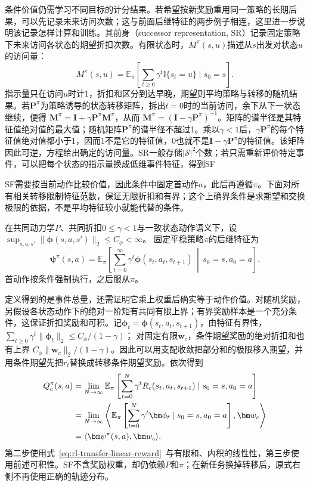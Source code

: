 条件价值仍需学习不同目标的计分结果。若希望按新奖励重用同一策略的长期后果，可以先记录未来访问次数；这与前面后继特征的两步例子相连，这里进一步说明该记录怎样计算和训练。其前身（successor representation, SR）记录固定策略下未来访问各状态的期望折扣次数。有限状态时，$M^\pi(s,u)$描述从$s$出发对状态$u$的访问量：
\[
 M^\pi(s,u)=\mathbb E_\pi\!\left[\sum_{t\geq0}\gamma^t
       \mathbb I\{s_t=u\}\mid s_0=s\right].
\]
指示量只在访问$u$时计1，折扣和区分到达早晚，期望则平均策略与转移的随机结果。若$\bm P^\pi$为策略诱导的状态转移矩阵，拆出$t=0$时的当前访问，余下从下一状态继续，便得
$\bm M^\pi=\bm I+\gamma\bm P^\pi\bm M^\pi$，从而
$\bm M^\pi=(\bm I-\gamma\bm P^\pi)^{-1}$。矩阵的谱半径是其特征值绝对值的最大值；随机矩阵$\bm P^\pi$的谱半径不超过1。乘以$\gamma<1$后，$\gamma\bm P^\pi$的每个特征值绝对值都小于1，因而1不是它的特征值，0也就不是$\bm I-\gamma\bm P^\pi$的特征值。该矩阵因此可逆，方程给出确定的访问量。SR一般存储$|\mathcal S|^2$个数；若只需重新评价特定事件，可以把每个状态的指示量换成低维事件特征，得到SF

SF需要按当前动作比较价值，因此条件中固定首动作$a$，此后再遵循$\pi$。下面对所有相关转移限制特征范数，保证无限折扣和有界；这个上确界条件是求期望和交换极限的依据，不是平均特征较小就能代替的条件。

\begin{definition}[固定策略的后继特征]
 \label{def:rl-transfer-sf}
 在共同动力学$P$、共同折扣$0\leq\gamma<1$与一致状态动作语义下，设
 $\sup_{s,a,s'}\lVert\bm\phi(s,a,s')\rVert_2\leq C_\phi<\infty$。
 固定平稳策略$\pi$的后继特征为
 \begin{equation}
 \bm\psi^\pi(s,a)=
 \mathbb E_\pi\!\left[
 \sum_{t=0}^{\infty}\gamma^t\bm\phi(s_t,a_t,s_{t+1})
 \,\middle|\,s_0=s,a_0=a\right].
 \label{eq:rl-transfer-sf}
 \end{equation}
 首动作按条件强制执行，之后服从$\pi$。
\end{definition}

定义得到的是事件总量，还需证明它乘上权重后确实等于动作价值。对随机奖励，另假设各状态动作下的绝对一阶矩有共同有限上界；有界奖励样本是一个充分条件，这保证折扣奖励和可积。记$\bm\phi_t=\bm\phi(s_t,a_t,s_{t+1})$，由特征有界性，
$\sum_{t\geq0}\gamma^t\lVert\bm\phi_t\rVert_2\leq C_\phi/(1-\gamma)$；
对固定有限$\bm w_c$，条件期望奖励的绝对折扣和也有上界
$C_\phi\lVert\bm w_c\rVert_2/(1-\gamma)$。因此可以用支配收敛把部分和的极限移入期望，并用条件期望先把$r_t$替换成转移条件期望奖励。依次得到
\begin{align}
 Q_c^\pi(s,a)
 &=\lim_{N\to\infty}\mathbb E_\pi
       \left[\sum_{t=0}^{N}\gamma^t R_c(s_t,a_t,s_{t+1})
       \mid s_0=s,a_0=a\right]\notag\\
 &=\lim_{N\to\infty}\left\langle
       \mathbb E_\pi\left[\sum_{t=0}^{N}\gamma^t\bm\phi_t
       \mid s_0=s,a_0=a\right],\bm w_c\right\rangle\notag\\
 &=\langle\bm\psi^\pi(s,a),\bm w_c\rangle.
 \label{eq:rl-transfer-sf-value}
\end{align}
第二步使用式~\eqref{eq:rl-transfer-linear-reward}~与有限和、内积的线性性，第三步使用前述可积性。SF不含奖励权重，却仍依赖$P$和$\pi$；在新任务换掉转移后，原式右侧不再使用正确的轨迹分布。

